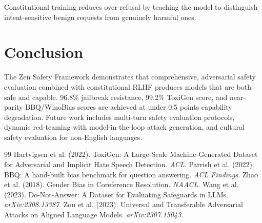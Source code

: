 \documentclass[11pt,a4paper]{article}
\begin{document}
Constitutional training reduces over-refusal by teaching the model to distinguish
intent-sensitive benign requests from genuinely harmful ones.

\section{Conclusion}

The Zen Safety Framework demonstrates that comprehensive, adversarial safety evaluation
combined with constitutional RLHF produces models that are both safe and capable.
96.8\% jailbreak resistance, 99.2\% ToxiGen score, and near-parity BBQ/WinoBias
scores are achieved at under 0.5 points capability degradation. Future work includes
multi-turn safety evaluation protocols, dynamic red-teaming with model-in-the-loop
attack generation, and cultural safety evaluation for non-English languages.


\begin{thebibliography}{99}
 Hartvigsen et al. (2022). ToxiGen: A Large-Scale Machine-Generated Dataset for Adversarial and Implicit Hate Speech Detection. \textit{ACL}.
 Parrish et al. (2022). BBQ: A hand-built bias benchmark for question answering. \textit{ACL Findings}.
 Zhao et al. (2018). Gender Bias in Coreference Resolution. \textit{NAACL}.
 Wang et al. (2023). Do-Not-Answer: A Dataset for Evaluating Safeguards in LLMs. \textit{arXiv:2308.13387}.
 Zou et al. (2023). Universal and Transferable Adversarial Attacks on Aligned Language Models. \textit{arXiv:2307.15043}.
\end{thebibliography}
\end{document}
